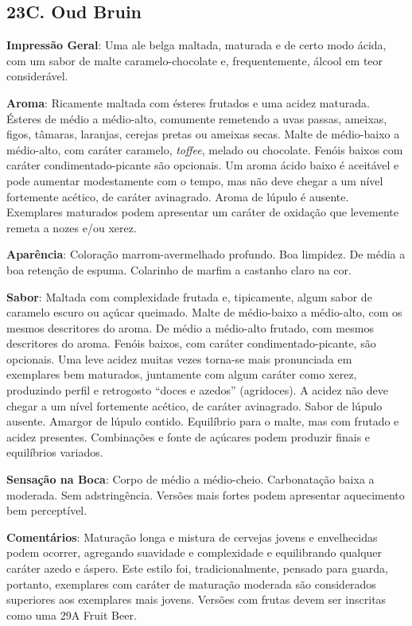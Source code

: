\subsection*{23C. Oud Bruin}
\textbf{Impressão Geral}: Uma ale belga maltada, maturada e de certo modo ácida, com um sabor de malte caramelo-chocolate e, frequentemente, álcool em teor considerável.

\textbf{Aroma}: Ricamente maltada com ésteres frutados e uma acidez maturada. Ésteres de médio a médio-alto, comumente remetendo a uvas passas, ameixas, figos, tâmaras, laranjas, cerejas pretas ou ameixas secas. Malte de médio-baixo a médio-alto, com caráter caramelo, \textit{toffee}, melado ou chocolate. Fenóis baixos com caráter condimentado-picante são opcionais. Um aroma ácido baixo é aceitável e pode aumentar modestamente com o tempo, mas não deve chegar a um nível fortemente acético, de caráter avinagrado. Aroma de lúpulo é ausente. Exemplares maturados podem apresentar um caráter de oxidação que levemente remeta a nozes e/ou xerez.

\textbf{Aparência}: Coloração marrom-avermelhado profundo. Boa limpidez. De média a boa retenção de espuma. Colarinho de marfim a castanho claro na cor.

\textbf{Sabor}: Maltada com complexidade frutada e, tipicamente, algum sabor de caramelo escuro ou açúcar queimado. Malte de médio-baixo a médio-alto, com os mesmos descritores do aroma. De médio a médio-alto frutado, com mesmos descritores do aroma. Fenóis baixos, com caráter condimentado-picante, são opcionais. Uma leve acidez muitas vezes torna-se mais pronunciada em exemplares bem maturados, juntamente com algum caráter como xerez, produzindo perfil e retrogosto “doces e azedos” (agridoces). A acidez não deve chegar a um nível fortemente acético, de caráter avinagrado. Sabor de lúpulo ausente. Amargor de lúpulo contido. Equilíbrio para o malte, mas com frutado e acidez presentes. Combinações e fonte de açúcares podem produzir finais e equilíbrios variados.

\textbf{Sensação na Boca}: Corpo de médio a médio-cheio. Carbonatação baixa a moderada. Sem adstringência. Versões mais fortes podem apresentar aquecimento bem perceptível.

\textbf{Comentários}: Maturação longa e mistura de cervejas jovens e envelhecidas podem ocorrer, agregando suavidade e complexidade e equilibrando qualquer caráter azedo e áspero. Este estilo foi, tradicionalmente, pensado para guarda, portanto, exemplares com caráter de maturação moderada são considerados superiores aos exemplares mais jovens. Versões com frutas devem ser inscritas como uma 29A Fruit Beer.

